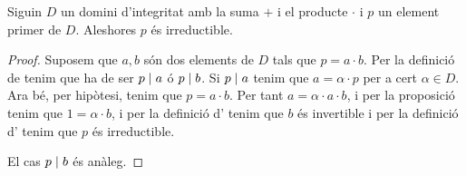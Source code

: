 \documentclass[../Apunts.tex]{subfiles}
\begin{document}
	\begin{proposition}
		Siguin \(D\) un domini d'integritat amb la suma \(+\) i el producte \(\cdot\) i \(p\) un element primer de \(D\). Aleshores \(p\) és irreductible.
		\begin{proof}
			Suposem que \(a,b\) són dos elements de \(D\) tals que \(p=a\cdot b\). Per la definició de  tenim que ha de ser \(p\mathrel{|} a\) ó \(p\mathrel{|} b\). Si \(p\mathrel{|} a\) tenim que \(a=\alpha\cdot p\) per a cert \(\alpha\in D\). Ara bé, per hipòtesi, tenim que \(p=a\cdot b\). Per tant \(a=\alpha\cdot a\cdot b\), i per la proposició  tenim que \(1=\alpha\cdot b\), i per la definició d' tenim que \(b\) és invertible i per la definició d' tenim que \(p\) és irreductible.
			
			El cas \(p\mathrel{|} b\) és anàleg.
		\end{proof}
	\end{proposition}
\end{document}
